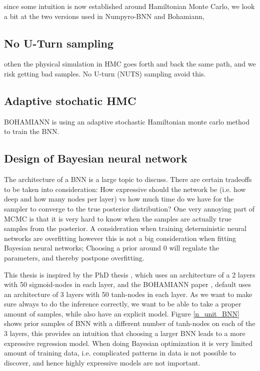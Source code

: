 since some intuition is now established around Hamiltonian Monte Carlo, 
we look a bit at the two versions used in Numpyro-BNN and Bohamiann, 

\subsection{No U-Turn sampling}

othen the physical simulation in HMC goes forth and back the same path, and we risk getting bad samples.
No U-turn (NUTS) sampling avoid this. 

\subsection{Adaptive stochatic HMC}
BOHAMIANN is using an adaptive stochastic Hamiltonian monte carlo method to train the BNN. 


\subsection{Design of Bayesian neural network}
The architecture of a BNN is a large topic to discuss. There are certain tradeoffs to be taken into
consideration: How expressive should the network be (i.e. how deep and how many nodes per layer) vs
how much time do we have for the sampler to converge to the true posterior distribution? One very
annoying part of MCMC is that it is very hard to know when the samples are actually true samples
from the posterior. A consideration when training deterministic neural networks are overfitting
however this is not a big consideration when fitting Bayesian neural networks; Choosing a prior
around 0 will regulate the parameters, and thereby postpone overfitting. 

This thesis is inspired by the PhD thesis \cite{PhDthesis}, which uses an architecture of a 2 layers
with 50 sigmoid-nodes in each layer, and the BOHAMIANN paper \cite{BOHAMIANN}, default uses an architecture
of 3 layers with 50 tanh-nodes in each layer. As we want to make sure always to do the 
inference correctly, we want to be able to take a proper amount of samples, while also
have an explicit model. Figure \eqref{n_unit_BNN} shows prior samples of BNN with a different
number of tanh-nodes on each of the 3 layers, this provides an intuition that choosing a larger
BNN leads to a more expressive regression model. When doing Bayesian optimization it is very limited
amount of training data, i.e. complicated patterns in data is not possible to discover, and hence 
highly expressive models are not important. 



